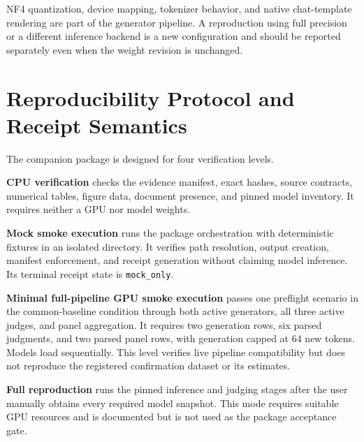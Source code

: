 \documentclass[conference]{IEEEtran}
\begin{document}
NF4 quantization, device mapping, tokenizer behavior, and native chat-template rendering are part of the generator pipeline. A reproduction using full precision or a different inference backend is a new configuration and should be reported separately even when the weight revision is unchanged.

\section{Reproducibility Protocol and Receipt Semantics}
\label{app:repro}

The companion package is designed for four verification levels.

\textbf{CPU verification} checks the evidence manifest, exact hashes, source contracts, numerical tables, figure data, document presence, and pinned model inventory. It requires neither a GPU nor model weights.

\textbf{Mock smoke execution} runs the package orchestration with deterministic fixtures in an isolated directory. It verifies path resolution, output creation, manifest enforcement, and receipt generation without claiming model inference. Its terminal receipt state is \texttt{mock\_only}.

\textbf{Minimal full-pipeline GPU smoke execution} passes one preflight scenario in the common-baseline condition through both active generators, all three active judges, and panel aggregation. It requires two generation rows, six parsed judgments, and two parsed panel rows, with generation capped at 64 new tokens. Models load sequentially. This level verifies live pipeline compatibility but does not reproduce the registered confirmation dataset or its estimates.

\textbf{Full reproduction} runs the pinned inference and judging stages after the user manually obtains every required model snapshot. This mode requires suitable GPU resources and is documented but is not used as the package acceptance gate.
\end{document}
